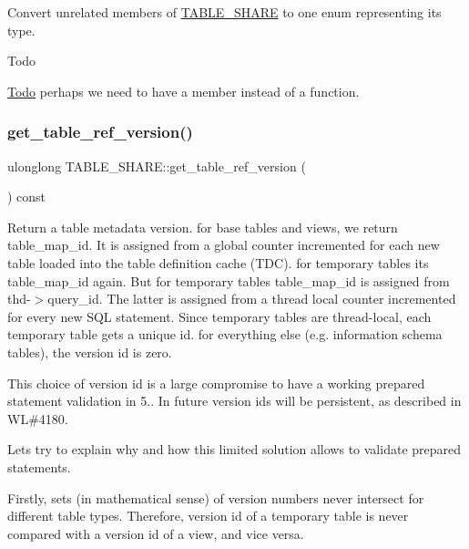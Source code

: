 Convert unrelated members of \mbox{\hyperlink{structTABLE__SHARE}{T\+A\+B\+L\+E\+\_\+\+S\+H\+A\+RE}} to one enum representing its type.

\begin{DoxyRefDesc}{Todo}
\item[\mbox{\hyperlink{todo__todo000131}{Todo}}]perhaps we need to have a member instead of a function. \end{DoxyRefDesc}
\mbox{\label{structTABLE__SHARE_a87f19366f330007fb29fa6261961fb06}} 
\subsubsection{\texorpdfstring{get\+\_\+table\+\_\+ref\+\_\+version()}{get\_table\_ref\_version()}}
{\footnotesize\ttfamily ulonglong T\+A\+B\+L\+E\+\_\+\+S\+H\+A\+R\+E\+::get\+\_\+table\+\_\+ref\+\_\+version (\begin{DoxyParamCaption}{ }\end{DoxyParamCaption}) const\hspace{0.3cm}{\ttfamily [inline]}}

Return a table metadata version. for base tables and views, we return table\+\_\+map\+\_\+id. It is assigned from a global counter incremented for each new table loaded into the table definition cache (T\+DC). for temporary tables it\textquotesingle{}s table\+\_\+map\+\_\+id again. But for temporary tables table\+\_\+map\+\_\+id is assigned from thd-\/$>$query\+\_\+id. The latter is assigned from a thread local counter incremented for every new S\+QL statement. Since temporary tables are thread-\/local, each temporary table gets a unique id. for everything else (e.\+g. information schema tables), the version id is zero.

This choice of version id is a large compromise to have a working prepared statement validation in 5.. In future version ids will be persistent, as described in WL\#4180.

Let\textquotesingle{}s try to explain why and how this limited solution allows to validate prepared statements.

Firstly, sets (in mathematical sense) of version numbers never intersect for different table types. Therefore, version id of a temporary table is never compared with a version id of a view, and vice versa.

